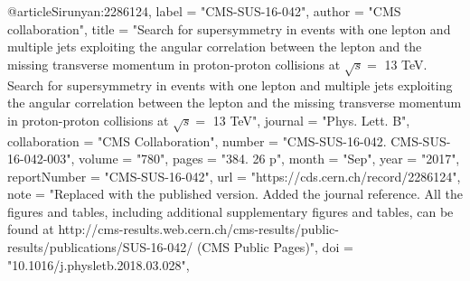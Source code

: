 @article{Sirunyan:2286124,
      label          = "CMS-SUS-16-042",
      author        = "{CMS collaboration}",
      title         = "{Search for supersymmetry in events with one lepton and
                       multiple jets exploiting the angular correlation between
                       the lepton and the missing transverse momentum in
                       proton-proton collisions at $\sqrt{s} = $ 13 TeV. Search
                       for supersymmetry in events with one lepton and multiple
                       jets exploiting the angular correlation between the lepton
                       and the missing transverse momentum in proton-proton
                       collisions at $\sqrt{s} = $ 13 TeV}",
      journal       = "Phys. Lett. B",
      collaboration = "CMS Collaboration",
      number        = "CMS-SUS-16-042. CMS-SUS-16-042-003",
      volume        = "780",
      pages         = "384. 26 p",
      month         = "Sep",
      year          = "2017",
      reportNumber  = "CMS-SUS-16-042",
      url           = "https://cds.cern.ch/record/2286124",
      note          = "Replaced with the published version. Added the journal
                       reference. All the figures and tables, including additional
                       supplementary figures and tables, can be found at
                       http://cms-results.web.cern.ch/cms-results/public-results/publications/SUS-16-042/
                       (CMS Public Pages)",
      doi           = "10.1016/j.physletb.2018.03.028",
}

